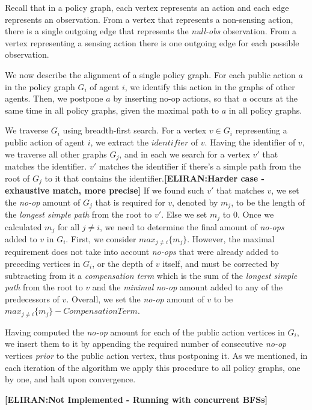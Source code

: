 \documentclass[letterpaper]{article} %
\newcommand{\eliran}[1]{\textbf{[\color{red}ELIRAN:#1]}}
\begin{document}
Recall that in a policy graph, each vertex represents an action and each edge represents an observation. From a vertex that represents a non-sensing action, there is a single outgoing edge that represents the \emph{null-obs} observation. From a vertex representing a sensing action there is one outgoing edge for each possible observation.

We now describe the alignment of a single policy graph. For each public action $a$ in the policy graph $G_i$ of agent $i$, we identify this action in the graphs of other agents.
Then, we postpone $a$ by inserting no-op actions, so that $a$ occurs at the same time in all policy graphs, given the maximal path to $a$ in all policy graphs.

We traverse $G_i$ using breadth-first search. For a vertex $v\in G_i$ representing a public action of agent $i$, we extract the $identifier$ of $v$. Having the identifier of $v$, we traverse all other graphs $G_j$, and in each we search for a vertex $v'$ that matches the identifier. $v'$ matches the identifier if there's a simple path from the root of $G_j$ to it that contains the identifier.\eliran{Harder case - exhaustive match, more precise}
If we found such $v'$ that matches $v$, we set the {\em no-op} amount of $G_j$ that is required for $v$, denoted by $m_j$, to be the length of the \emph{longest simple path} from the root to $v'$. Else we set $m_j$ to 0.
Once we calculated $m_j$ for all $j\neq i$, we need to determine the final amount of {\em no-ops} added to $v$ in $G_i$. First, we consider $max_{j\neq i}\{m_j\}$. However, the maximal requirement does not take into account {\em no-ops} that were already added to preceding vertices in $G_i$, or the depth of $v$ itself, and must be
corrected by subtracting from it a \emph{compensation term} which is the sum of the \emph{longest simple path} from the root to $v$ and the \emph{minimal} {\em no-op} amount added to any of the predecessors of $v$. Overall, we set the {\em no-op} amount of $v$ to be $max_{j\neq i}\{m_j\} - \mathit{CompensationTerm}$.

Having computed the  {\em no-op} amount for each of the public action vertices in $G_i$, we insert them to it by appending the required number of consecutive {\em no-op} vertices \emph{prior} to the public action vertex, thus postponing it.
As we mentioned, in each iteration of the algorithm we apply this procedure to all policy graphs, one by one, and halt upon convergence.

\eliran{Not Implemented - Running with concurrent BFSs}
\end{document}
